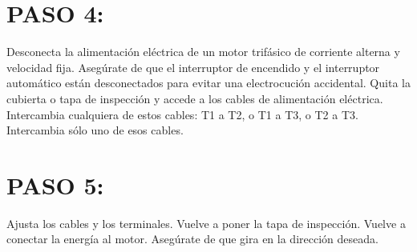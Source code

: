 \documentclass{article}
\begin{document}
\section{PASO 4:}
Desconecta la alimentación eléctrica de un motor trifásico de corriente alterna y velocidad fija. Asegúrate de que el interruptor de encendido y el interruptor automático están desconectados para evitar una electrocución accidental. Quita la cubierta o tapa de inspección y accede a los cables de alimentación eléctrica. Intercambia cualquiera de estos cables: T1 a T2, o T1 a T3, o T2 a T3. Intercambia sólo uno de esos cables.

\section{PASO 5:}
Ajusta los cables y los terminales. Vuelve a poner la tapa de inspección. Vuelve a conectar la energía al motor. Asegúrate de que gira en la dirección deseada.
\end{document}
